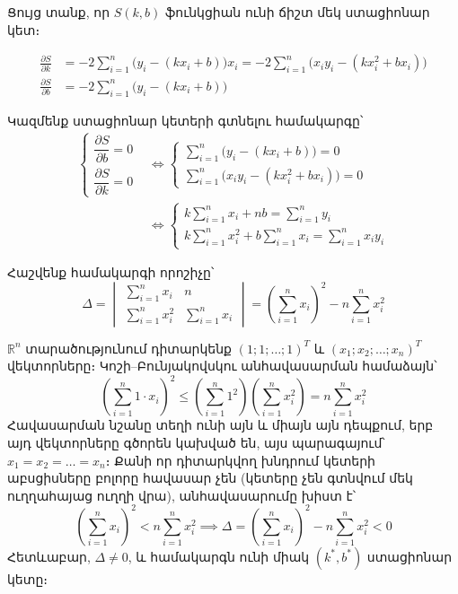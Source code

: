 \documentclass[12pt,a4paper]{article}
\numberwithin{equation}{section}
\numberwithin{figure}{section}
\begin{document}
Ցույց տանք, որ $S(k, b)$ ֆունկցիան ունի ճիշտ մեկ ստացիոնար կետ։

\begin{align*}
\frac{\partial S}{\partial k} &= -2 \sum_{i=1}^n \bigl(y_i - (kx_i + b)\bigr) x_i = -2 \sum_{i=1}^n \bigl(x_i y_i - (kx_i^2 + b x_i)\bigr) \\
\frac{\partial S}{\partial b} &= -2 \sum_{i=1}^n \bigl(y_i - (kx_i + b)\bigr)
\end{align*}

Կազմենք ստացիոնար կետերի գտնելու համակարգը՝
\begin{align*}
\begin{cases}
\dfrac{\partial S}{\partial b} = 0 \\[8pt]
\dfrac{\partial S}{\partial k} = 0
\end{cases}
&\Longleftrightarrow
\begin{cases}
\displaystyle\sum_{i=1}^n \bigl(y_i - (kx_i + b)\bigr) = 0 \\[12pt]
\displaystyle\sum_{i=1}^n \bigl(x_i y_i - (kx_i^2 + b x_i)\bigr) = 0
\end{cases} \\[10pt]
&\Longleftrightarrow
\begin{cases}
\displaystyle k \sum_{i=1}^n x_i + nb = \sum_{i=1}^n y_i \\[12pt]
\displaystyle k \sum_{i=1}^n x_i^2 + b \sum_{i=1}^n x_i = \sum_{i=1}^n x_i y_i
\end{cases}
\end{align*}

Հաշվենք համակարգի որոշիչը՝
\[
\Delta =
\begin{vmatrix}
\displaystyle\sum_{i=1}^n x_i & n \\[12pt]
\displaystyle\sum_{i=1}^n x_i^2 & \displaystyle\sum_{i=1}^n x_i
\end{vmatrix}
= \left(\sum_{i=1}^n x_i\right)^2 - n \sum_{i=1}^n x_i^2
\]

$\mathbb{R}^n$ տարածությունում դիտարկենք $(1; 1; \dots; 1)^T$ և $(x_1; x_2; \dots; x_n)^T$ վեկտորները։ Կոշի–Բունյակովսկու անհավասարման համաձայն՝
\[
\left(\sum_{i=1}^n 1 \cdot x_i\right)^2 \leqslant \left(\sum_{i=1}^n 1^2\right) \left(\sum_{i=1}^n x_i^2\right) = n \sum_{i=1}^n x_i^2
\]
Հավասարման նշանը տեղի ունի այն և միայն այն դեպքում, երբ այդ վեկտորները գծորեն կախված են, այս պարագայում՝ $x_1 = x_2 = \dots = x_n$։ Քանի որ դիտարկվող խնդրում կետերի աբսցիսները բոլորը հավասար չեն (կետերը չեն գտնվում մեկ ուղղահայաց ուղղի վրա), անհավասարումը խիստ է՝
\[
\left(\sum_{i=1}^n x_i\right)^2 < n \sum_{i=1}^n x_i^2 \implies \Delta = \left(\sum_{i=1}^n x_i\right)^2 - n \sum_{i=1}^n x_i^2 < 0
\]
Հետևաբար, $\Delta \neq 0$, և համակարգն ունի միակ $(k^*, b^*)$ ստացիոնար կետը։
\end{document}

